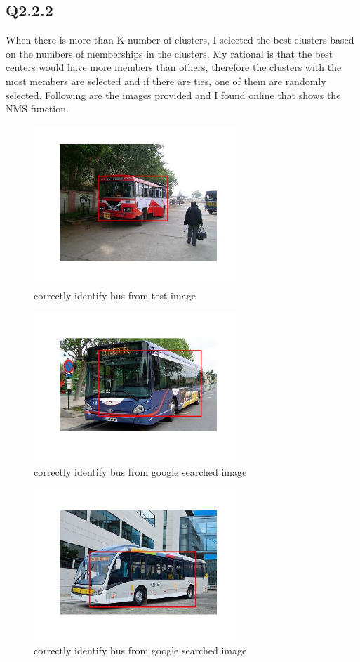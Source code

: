 \documentclass{article}
\begin{document}
\subsection*{Q2.2.2}
When there is more than K number of clusters, I selected the best clusters based on the numbers of memberships in the clusters. My rational is that the best centers would have more members than others, therefore the clusters with the most members are selected and if there are ties, one of them are randomly selected. Following are the images provided and I found online that shows the NMS function.
\begin{figure}[H]
    \centering
    \includegraphics[width=3in]{./figures/q42_result0.jpg}
    \caption{correctly identify bus from test image}
\end{figure}
\begin{figure}[H]
    \centering
    \includegraphics[width=3in]{./figures/q42_result1.jpg}
    \caption{correctly identify bus from google searched image}
\end{figure}
\begin{figure}[H]
    \centering
    \includegraphics[width=3in]{./figures/q42_result2.jpg}
    \caption{correctly identify bus from google searched image}
\end{figure}
\end{document}
